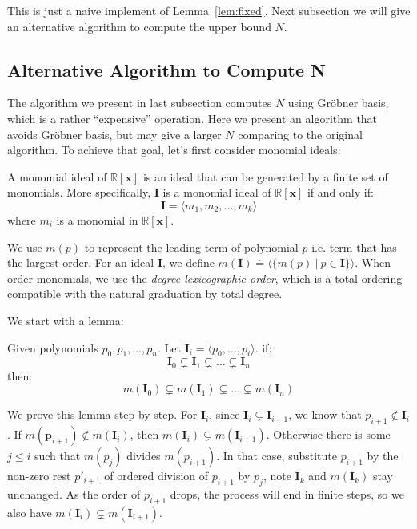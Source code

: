 \documentclass{jssc}
\begin{document}
This is just a naive implement of Lemma~\ref{lem:fixed}. Next subsection we will give an alternative algorithm to compute the upper bound $N$.

\subsection{Alternative Algorithm to Compute N}
\label{sub:alternative}
The algorithm we present in last subsection computes $N$ using Gr\"{o}bner basis, which is a rather ``expensive'' operation. Here we present an algorithm that avoids Gr\"{o}bner basis, but may give a larger $N$ comparing to the original algorithm. To achieve that goal, let's first consider monomial ideals:

\begin{definition}
\label{def:monomialIdeal}
A monomial ideal of $\mathbb{R}[\boldsymbol{x}]$ is an ideal that can be generated by a finite set of monomials. More specifically, $\boldsymbol{I}$ is a monomial ideal of $\mathbb{R}[\boldsymbol{x}]$ if and only if: 
\begin{displaymath}
	\boldsymbol{I} = \langle m_1, m_2, \dots, m_k \rangle 
\end{displaymath}
where $m_i$ is a monomial in $\mathbb{R}[\boldsymbol{x}]$.
\end{definition}

We use $m(p)$ to represent the leading term of polynomial $p$ i.e. term that has the largest order. For an ideal $\boldsymbol{I}$, we define $m(\boldsymbol{I}) \doteq \langle \{m(p)\ |\ p \in \boldsymbol{I} \} \rangle$. When order monomials, we use the \emph{degree-lexicographic order}, which is a total ordering compatible with the natural graduation by total degree. 

We start with a lemma:

\begin{lemma}
\label{lem:monomialChain}
Given polynomials $p_0, p_1, \dots, p_n$. Let $\boldsymbol{I}_i = \langle p_0, \dots, p_i \rangle$. if: 
	\begin{equation*}
		\boldsymbol{I}_0 \subsetneq \boldsymbol{I}_1 \subsetneq \dots \subsetneq \boldsymbol{I}_n
	\end{equation*}
then: 
	\begin{equation*}
		m(\boldsymbol{I}_0) \subsetneq m(\boldsymbol{I}_1) \subsetneq \dots \subsetneq m(\boldsymbol{I}_n)
	\end{equation*}
\end{lemma}

\proof
We prove this lemma step by step. For $\boldsymbol{I}_i$, since $\boldsymbol{I}_i \subsetneq \boldsymbol{I}_{i+1}$, we know that $p_{i+1} \notin \boldsymbol{I}_i$. If $m(\boldsymbol{p}_{i+1}) \notin m(\boldsymbol{I}_i)$, then $m(\boldsymbol{I}_i) \subsetneq m(\boldsymbol{I}_{i+1})$. Otherwise there is some $j \leq i$ such that $m(p_j)$ divides $m(p_{i+1})$. In that case, substitute $p_{i+1}$ by the non-zero rest $p'_{i+1}$ of ordered division of $p_{i+1}$ by $p_j$, note $\boldsymbol{I}_k$ and $m(\boldsymbol{I}_k)$ stay unchanged. As the order of $p_{i+1}$ drops, the process will end in finite steps, so we also have $m(\boldsymbol{I}_i) \subsetneq m(\boldsymbol{I}_{i+1})$.
\end{document}
